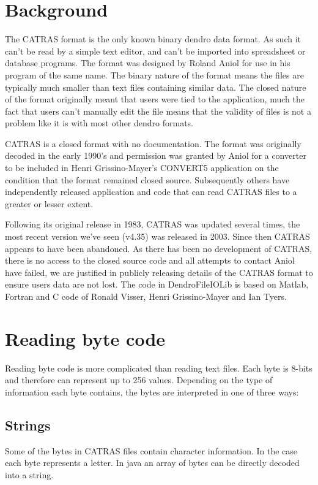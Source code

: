 \documentclass[10pt, headsepline,DIV14,BCOR0.5cm]{scrreprt}
\begin{document}
\section{Background}
The CATRAS format is the only known binary dendro data format. As such it can't be read by a simple text editor, and can't be imported into spreadsheet or database programs. The format was designed by Roland Aniol for use in his program of the same name. The binary nature of the format means the files are typically much smaller than text files containing similar data. The closed nature of the format originally meant that users were tied to the application, much the fact that users can't manually edit the file means that the validity of files is not a problem like it is with most other dendro formats.

CATRAS is a closed format with no documentation. The format was originally decoded in the early 1990's and permission was granted by Aniol for a converter to be included in Henri Grissino-Mayer's CONVERT5 application on the condition that the format remained closed source. Subsequently others have independently released application and code that can read CATRAS files to a greater or lesser extent.

Following its original release in 1983, CATRAS was updated several times, the most recent version we've seen (v4.35) was released in 2003. Since then CATRAS appears to have been abandoned. As there has been no development of CATRAS, there is no access to the closed source code and all attempts to contact Aniol have failed, we are justified in publicly releasing details of the CATRAS format to ensure users data are not lost. The code in DendroFileIOLib is based on Matlab, Fortran and C code of Ronald Visser, Henri Grissino-Mayer and Ian Tyers. 

\section{Reading byte code}

Reading byte code is more complicated than reading text files. Each byte is 8-bits and therefore can represent up to 256 values. Depending on the type of information each byte contains, the bytes are interpreted in one of three ways: 

\subsection{Strings} Some of the bytes in CATRAS files contain character information. In the case each byte represents a letter. In java an array of bytes can be directly decoded into a string. 
\end{document}
